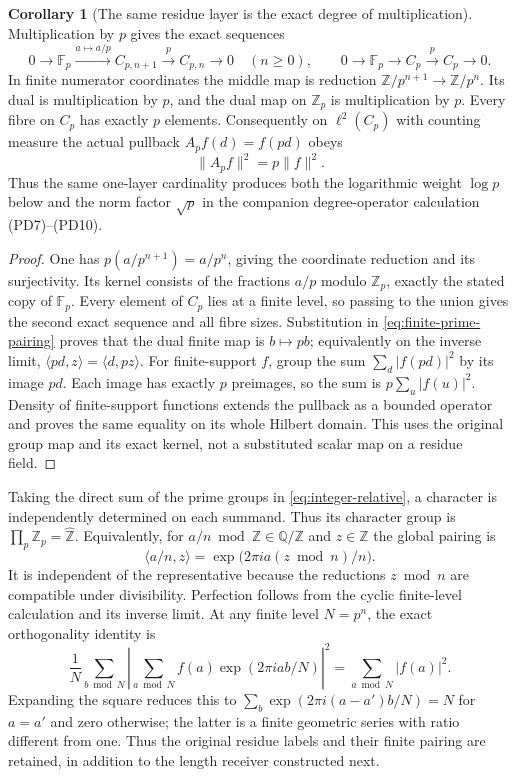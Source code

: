 \documentclass[11pt,a4paper]{article}
\theoremstyle{definition}\newtheorem{definition}[theorem]{Definition}
\newtheorem{corollary}[theorem]{Corollary}
\begin{document}
\begin{corollary}[The same residue layer is the exact degree of multiplication]
\label{cor:prime-degree}
Multiplication by $p$ gives the exact sequences
\[
 0\longrightarrow\mathbb F_p\xrightarrow{a\mapsto a/p}C_{p,n+1}
 \xrightarrow{\ p\ }C_{p,n}\longrightarrow0\quad(n\ge0),
 \qquad
 0\longrightarrow\mathbb F_p\longrightarrow C_p
 \xrightarrow{\ p\ }C_p\longrightarrow0.
 \tag{RP30a}\label{eq:prime-degree}
\]
In finite numerator coordinates the middle map is reduction
$\mathbb Z/p^{n+1}\to\mathbb Z/p^n$. Its dual is multiplication by
$p$, and the dual map on $\mathbb Z_p$ is multiplication by $p$.
Every fibre on $C_p$ has exactly $p$ elements. Consequently on
$\ell^2(C_p)$ with counting measure the actual pullback
$A_pf(d)=f(pd)$ obeys
\[
 \|A_pf\|^2=p\|f\|^2.
 \tag{RP30b}\label{eq:prime-degree-norm}
\]
Thus the same one-layer cardinality produces both the logarithmic
weight $\log p$ below and the norm factor $\sqrt p$ in the companion
degree-operator calculation (PD7)--(PD10).
\end{corollary}
\begin{proof}
One has $p(a/p^{n+1})=a/p^n$, giving the coordinate reduction and its
surjectivity. Its kernel consists of the fractions $a/p$ modulo
$\mathbb Z_p$, exactly the stated copy of $\mathbb F_p$. Every element
of $C_p$ lies at a finite level, so passing to the union gives the
second exact sequence and all fibre sizes. Substitution in
\eqref{eq:finite-prime-pairing} proves that the dual finite map is
$b\mapsto pb$; equivalently on the inverse limit,
$\langle pd,z\rangle=\langle d,pz\rangle$.
For finite-support $f$, group the sum $\sum_d|f(pd)|^2$ by its image
$pd$. Each image has exactly $p$ preimages, so the sum is
$p\sum_u|f(u)|^2$. Density of finite-support functions extends the
pullback as a bounded operator and proves the same equality on its
whole Hilbert domain. This uses the original group map and its exact
kernel, not a substituted scalar map on a residue field.
\end{proof}

Taking the direct sum of the prime groups in
\eqref{eq:integer-relative}, a character is independently determined
on each summand. Thus its character group is
$\prod_p\mathbb Z_p=\widehat{\mathbb Z}$. Equivalently, for
$a/n\bmod\mathbb Z\in\mathbb Q/\mathbb Z$ and
$z\in\widehat{\mathbb Z}$ the global pairing is
\[
 \langle a/n,z\rangle=\exp\bigl(2\pi i a(z\bmod n)/n\bigr).
 \tag{RP31}\label{eq:global-character-pairing}
\]
It is independent of the representative because the reductions
$z\bmod n$ are compatible under divisibility. Perfection follows from
the cyclic finite-level calculation and its inverse limit. At any
finite level $N=p^n$, the exact orthogonality identity is
\[
 \frac1N\sum_{b\bmod N}
 \left|\sum_{a\bmod N}f(a)\exp(2\pi i ab/N)\right|^2
 =\sum_{a\bmod N}|f(a)|^2.
 \tag{RP32}\label{eq:finite-parseval}
\]
Expanding the square reduces this to
$\sum_b\exp(2\pi i(a-a')b/N)=N$ for $a=a'$ and zero otherwise;
the latter is a finite geometric series with ratio different from one.
Thus the original residue labels and their finite pairing are retained,
in addition to the length receiver constructed next.
\end{document}
